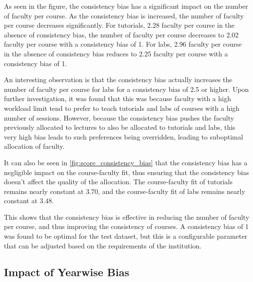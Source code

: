 As seen in the figure, the consistency bias has a significant impact on the number of faculty per course. As the consistency bias is increased, the number of faculty per course decreases significantly. For tutorials, 2.28 faculty per course in the absence of consistency bias, the number of faculty per course decreases to 2.02 faculty per course with a consistency bias of 1. For labs, 2.96 faculty per course in the absence of consistency bias reduces to 2.25 faculty per course with a consistency bias of 1.

An interesting observation is that the consistency bias actually increases the number of faculty per course for labs for a consistency bias of 2.5 or higher. Upon further investigation, it was found that this was because faculty with a high workload limit tend to prefer to teach tutorials and labs of courses with a high number of sessions. However, because the consistency bias pushes the faculty previously allocated to lectures to also be allocated to tutorials and labs, this very high bias leads to such preferences being overridden, leading to suboptimal allocation of faculty.

It can also be seen in \autoref{fig:score_consistency_bias} that the consistency bias has a negligible impact on the course-faculty fit, thus ensuring that the consistency bias doesn't affect the quality of the allocation. The course-faculty fit of tutorials remains nearly constant at 3.70, and the course-faculty fit of labs remains nearly constant at 3.48.

This shows that the consistency bias is effective in reducing the number of faculty per course, and thus improving the consistency of courses. A consistency bias of 1 was found to be optimal for the test dataset, but this is a configurable parameter that can be adjusted based on the requirements of the institution.

\subsection{Impact of Yearwise Bias}

